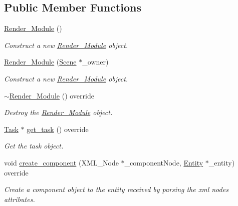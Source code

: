 \subsection*{Public Member Functions}
\begin{DoxyCompactItemize}
\item 
\mbox{\hyperlink{classbanita_1_1_render___module_ac1d3202b1acb7b04b6bab43b6d154417}{Render\+\_\+\+Module}} ()
\begin{DoxyCompactList}\small\item\em Construct a new \mbox{\hyperlink{classbanita_1_1_render___module}{Render\+\_\+\+Module}} object. \end{DoxyCompactList}\item 
\mbox{\hyperlink{classbanita_1_1_render___module_a3e74fda921261303b79e9f439080bf9d}{Render\+\_\+\+Module}} (\mbox{\hyperlink{classbanita_1_1_scene}{Scene}} $\ast$\+\_\+owner)
\begin{DoxyCompactList}\small\item\em Construct a new \mbox{\hyperlink{classbanita_1_1_render___module}{Render\+\_\+\+Module}} object. \end{DoxyCompactList}\item 
\mbox{\hyperlink{classbanita_1_1_render___module_a338c9943a6a739c0a2517203c2986d2d}{$\sim$\+Render\+\_\+\+Module}} () override
\begin{DoxyCompactList}\small\item\em Destroy the \mbox{\hyperlink{classbanita_1_1_render___module}{Render\+\_\+\+Module}} object. \end{DoxyCompactList}\item 
\mbox{\hyperlink{classbanita_1_1_task}{Task}} $\ast$ \mbox{\hyperlink{classbanita_1_1_render___module_a0fbb9b466fa3fd8f55a0898a4aa87bd0}{get\+\_\+task}} () override
\begin{DoxyCompactList}\small\item\em Get the task object. \end{DoxyCompactList}\item 
void \mbox{\hyperlink{classbanita_1_1_render___module_a639688937a247c3fcc21e720ec0982b7}{create\+\_\+component}} (X\+M\+L\+\_\+\+Node $\ast$\+\_\+component\+Node, \mbox{\hyperlink{classbanita_1_1_entity}{Entity}} $\ast$\+\_\+entity) override
\begin{DoxyCompactList}\small\item\em Create a component object to the entity received by parsing the xml node\textquotesingle{}s attributes. \end{DoxyCompactList}\end{DoxyCompactItemize}
